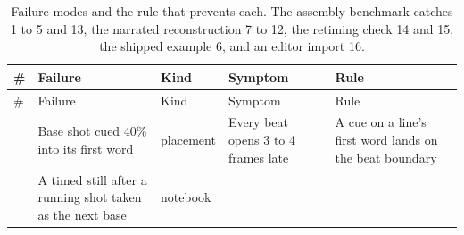 \documentclass{ceurart}
\begin{document}
\begingroup\small\begin{longtable}[]{@{}
  >{\raggedright\arraybackslash}p{}
  >{\raggedright\arraybackslash}p{}
  >{\raggedright\arraybackslash}p{}
  >{\raggedright\arraybackslash}p{}
  >{\raggedright\arraybackslash}p{}@{}}
\caption{Failure modes and the rule that prevents each. The assembly
benchmark catches 1 to 5 and 13, the narrated reconstruction 7 to 12,
the retiming check 14 and 15, the shipped example 6, and an editor
import 16.}\tabularnewline
\toprule\noalign{}
\begin{minipage}[b]{\linewidth}\raggedright
\#
\end{minipage} & \begin{minipage}[b]{\linewidth}\raggedright
Failure
\end{minipage} & \begin{minipage}[b]{\linewidth}\raggedright
Kind
\end{minipage} & \begin{minipage}[b]{\linewidth}\raggedright
Symptom
\end{minipage} & \begin{minipage}[b]{\linewidth}\raggedright
Rule
\end{minipage} \\
\midrule\noalign{}
\endfirsthead
\toprule\noalign{}
\begin{minipage}[b]{\linewidth}\raggedright
\#
\end{minipage} & \begin{minipage}[b]{\linewidth}\raggedright
Failure
\end{minipage} & \begin{minipage}[b]{\linewidth}\raggedright
Kind
\end{minipage} & \begin{minipage}[b]{\linewidth}\raggedright
Symptom
\end{minipage} & \begin{minipage}[b]{\linewidth}\raggedright
Rule
\end{minipage} \\
\midrule\noalign{}
\endhead
\bottomrule\noalign{}
\endlastfoot
1 & Base shot cued 40\% into its first word & placement & Every beat
opens 3 to 4 frames late & A cue on a line's first word lands on the
beat boundary \\
2 & A timed still after a running shot taken as the next base & notebook

\end{longtable}
\end{document}
